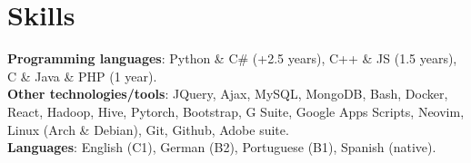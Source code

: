 \documentclass[letterpaper,11pt]{article}
\begin{document}
%
\section{Skills}
 \begin{itemize}[leftmargin=0.15in, label={}]
    \small{\item{
     \textbf{Programming languages}{: Python \& C\# (+2.5 years), C++ \& JS (1.5 years), C \& Java
     \& PHP (1 year).} \\
     \textbf{Other technologies/tools}{: JQuery, Ajax, MySQL, MongoDB, Bash, Docker, React,
     Hadoop, Hive, Pytorch, Bootstrap, G Suite, Google Apps Scripts, Neovim, Linux
     (Arch \& Debian), Git, Github, Adobe suite.} \\
     \textbf{Languages}{: English (C1), German (B2), Portuguese (B1), Spanish (native).}
    }}
 \end{itemize}


\end{document}
